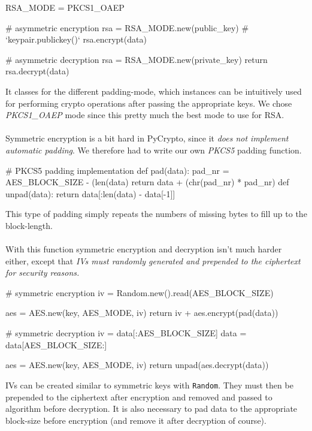 \documentclass[11pt, a4paper]{article}
\begin{document}
\vspace{5pt}
\begin{python}
	RSA_MODE = PKCS1_OAEP
	
	# asymmetric encryption
	rsa = RSA_MODE.new(public_key)  # `keypair.publickey()`
	rsa.encrypt(data)
	
	# asymmetric decryption
	rsa = RSA_MODE.new(private_key)
	return rsa.decrypt(data)
\end{python}
\vspace{10pt}

It classes for the different padding-mode, which instances can be intuitively used for performing crypto operations after passing the appropriate keys. We chose \textit{PKCS1\_OAEP} mode since this pretty much the best mode to use for RSA.
\\\\
Symmetric encryption is a bit hard in PyCrypto, since it \textit{does not implement automatic padding}. We therefore had to write our own \textit{PKCS5} padding function.

\vspace{5pt}
\begin{python}
# PKCS5 padding implementation
def pad(data):
	pad_nr = AES_BLOCK_SIZE - (len(data) %
	return data + (chr(pad_nr) * pad_nr)
def unpad(data):
	return data[:len(data) - data[-1]]
\end{python}
\vspace{10pt}

This type of padding simply repeats the numbers of missing bytes to fill up to the block-length.
\\\\
With this function symmetric encryption and decryption isn't much harder either, except that \textit{IVs must randomly generated and prepended to the ciphertext for security reasons.}

\vspace{5pt}
\begin{python}
# symmetric encryption
iv = Random.new().read(AES_BLOCK_SIZE)

aes = AES.new(key, AES_MODE, iv)
return iv + aes.encrypt(pad(data))

# symmetric decryption
iv = data[:AES_BLOCK_SIZE]
data = data[AES_BLOCK_SIZE:]

aes = AES.new(key, AES_MODE, iv)
return unpad(aes.decrypt(data))
\end{python}
\vspace{10pt}

IVs can be created similar to symmetric keys with \lstinline|Random|. They must then be prepended to the ciphertext after encryption and removed and passed to algorithm before decryption. It is also necessary to pad data to the appropriate block-size before encryption (and remove it after decryption of course).
\end{document}
